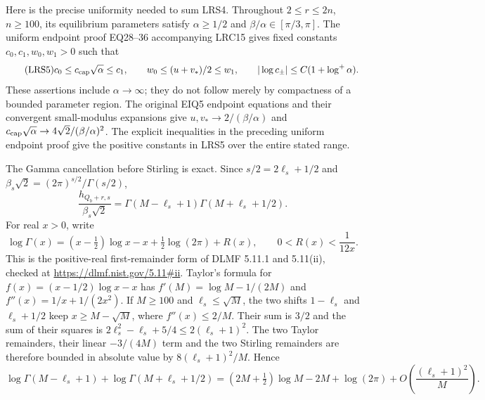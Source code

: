 \documentclass[11pt,a4paper]{article}
\begin{document}
Here is the precise uniformity needed to sum LRS4.  Throughout
$2\le r\le2n$, $n\ge100$, its equilibrium parameters satisfy
$\alpha\ge1/2$ and $\beta/\alpha\in[\pi/3,\pi]$.
The uniform endpoint proof EQ28--36 accompanying LRC15 gives fixed constants
$c_0,c_1,w_0,w_1>0$ such that
\begin{equation}\tag{LRS5}
 c_0\le c_{\rm cap}\sqrt\alpha\le c_1,
 \qquad w_0\le (u+v_*)/2\le w_1,
 \qquad |\log c_\pm|\le C(1+\log^+\alpha).
\end{equation}
These assertions include $\alpha\to\infty$; they do not follow
merely by compactness of a bounded parameter region.  The original
EIQ5 endpoint equations and their convergent small-modulus expansions
give $u,v_*\to2/(\beta/\alpha)$ and
$c_{\rm cap}\sqrt\alpha\to4\sqrt2/(\beta/\alpha)^2$.
The explicit inequalities in the preceding uniform endpoint proof
give the positive constants in LRS5 over the entire stated range.

The Gamma cancellation before Stirling is exact.  Since
$s/2=2\ell_s+1/2$ and
$\beta_s\sqrt2=(2\pi)^{s/2}/\Gamma(s/2)$,
\begin{equation}\tag{LRS6}
 \frac{h_{Q_b+r,s}}{\beta_s\sqrt2}
   =\Gamma(M-\ell_s+1)\Gamma(M+\ell_s+1/2).
\end{equation}
For real $x>0$, write
\[
 \log\Gamma(x)=(x-\tfrac12)\log x-x
              +\tfrac12\log(2\pi)+R(x),
 \qquad 0<R(x)<\frac1{12x}.
\]
This is the positive-real first-remainder form of DLMF
5.11.1 and 5.11(ii)\cite[\S5.11(i), equation~(5.11.1), and
\S5.11(ii)]{human:dlmf5}, checked at
\url{https://dlmf.nist.gov/5.11#ii}.
Taylor's formula for $f(x)=(x-1/2)\log x-x$ has
$f'(M)=\log M-1/(2M)$ and
$f''(x)=1/x+1/(2x^2)$.  If $M\ge100$ and $\ell_s\le\sqrt M$,
the two shifts $1-\ell_s$ and $\ell_s+1/2$ keep $x\ge M-\sqrt M$,
where $f''(x)\le2/M$.  Their sum is $3/2$ and the sum of their
squares is $2\ell_s^2-\ell_s+5/4\le2(\ell_s+1)^2$.
The two Taylor remainders, their linear $-3/(4M)$ term and the two
Stirling remainders are therefore bounded in absolute value by
$8(\ell_s+1)^2/M$.  Hence
\begin{equation}\tag{LRS7}
 \log\Gamma(M-\ell_s+1)+\log\Gamma(M+\ell_s+1/2)
 =(2M+\tfrac12)\log M-2M+\log(2\pi)
    +O\!\left(\frac{(\ell_s+1)^2}{M}\right).
\end{equation}
\end{document}
